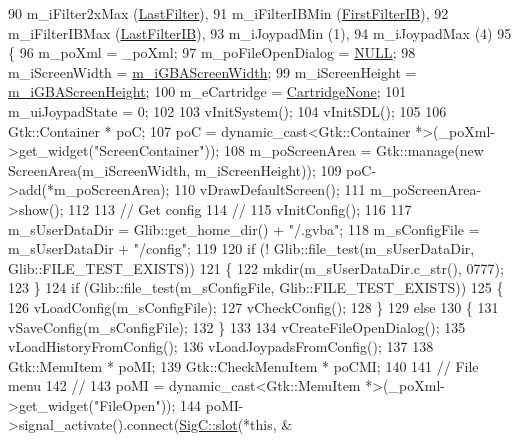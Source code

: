\begin{DoxyCode}
90   m\_iFilter2xMax    (\mbox{\hyperlink{class_v_b_a_a1683020d7324daf3bda627d0d3658e3ea93151049c1e37e54cc5da878a75fe687}{LastFilter}}),
91   m\_iFilterIBMin    (\mbox{\hyperlink{class_v_b_a_a304ffeb9f4a8b26e7fa4e2eb620d780fa82ad08b7cb0fb3a1705da0378852dd77}{FirstFilterIB}}),
92   m\_iFilterIBMax    (\mbox{\hyperlink{class_v_b_a_a304ffeb9f4a8b26e7fa4e2eb620d780fafca057c0928de0cb32742728aabd6354}{LastFilterIB}}),
93   m\_iJoypadMin      (1),
94   m\_iJoypadMax      (4)
95 \{
96   m\_poXml            = \_poXml;
97   m\_poFileOpenDialog = \mbox{\hyperlink{getopt1_8c_a070d2ce7b6bb7e5c05602aa8c308d0c4}{NULL}};
98   m\_iScreenWidth     = \mbox{\hyperlink{class_v_b_a_1_1_window_a9a7257c8edba5383674c7a7eea250679}{m\_iGBAScreenWidth}};
99   m\_iScreenHeight    = \mbox{\hyperlink{class_v_b_a_1_1_window_a5029d02ff8ee7d81fa7e9ad210d537d6}{m\_iGBAScreenHeight}};
100   m\_eCartridge       = \mbox{\hyperlink{class_v_b_a_1_1_window_af580451d3ee7a738a73434858a08fa65ab67c77301849c1cfd10bdedc74191761}{CartridgeNone}};
101   m\_uiJoypadState    = 0;
102 
103   vInitSystem();
104   vInitSDL();
105 
106   Gtk::Container * poC;
107   poC = \textcolor{keyword}{dynamic\_cast<}Gtk::Container *\textcolor{keyword}{>}(\_poXml->get\_widget(\textcolor{stringliteral}{"ScreenContainer"}));
108   m\_poScreenArea = Gtk::manage(\textcolor{keyword}{new} ScreenArea(m\_iScreenWidth, m\_iScreenHeight));
109   poC->add(*m\_poScreenArea);
110   vDrawDefaultScreen();
111   m\_poScreenArea->show();
112 
113   \textcolor{comment}{// Get config}
114   \textcolor{comment}{//}
115   vInitConfig();
116 
117   m\_sUserDataDir = Glib::get\_home\_dir() + \textcolor{stringliteral}{"/.gvba"};
118   m\_sConfigFile  = m\_sUserDataDir + \textcolor{stringliteral}{"/config"};
119 
120   \textcolor{keywordflow}{if} (! Glib::file\_test(m\_sUserDataDir, Glib::FILE\_TEST\_EXISTS))
121   \{
122     mkdir(m\_sUserDataDir.c\_str(), 0777);
123   \}
124   \textcolor{keywordflow}{if} (Glib::file\_test(m\_sConfigFile, Glib::FILE\_TEST\_EXISTS))
125   \{
126     vLoadConfig(m\_sConfigFile);
127     vCheckConfig();
128   \}
129   \textcolor{keywordflow}{else}
130   \{
131     vSaveConfig(m\_sConfigFile);
132   \}
133 
134   vCreateFileOpenDialog();
135   vLoadHistoryFromConfig();
136   vLoadJoypadsFromConfig();
137 
138   Gtk::MenuItem *      poMI;
139   Gtk::CheckMenuItem * poCMI;
140 
141   \textcolor{comment}{// File menu}
142   \textcolor{comment}{//}
143   poMI = \textcolor{keyword}{dynamic\_cast<}Gtk::MenuItem *\textcolor{keyword}{>}(\_poXml->get\_widget(\textcolor{stringliteral}{"FileOpen"}));
144   poMI->signal\_activate().connect(\mbox{\hyperlink{namespace_sig_c_a92e4f19202b77e78ac1db05f5a62f6b6}{SigC::slot}}(*\textcolor{keyword}{this}, &

\end{DoxyCode}
